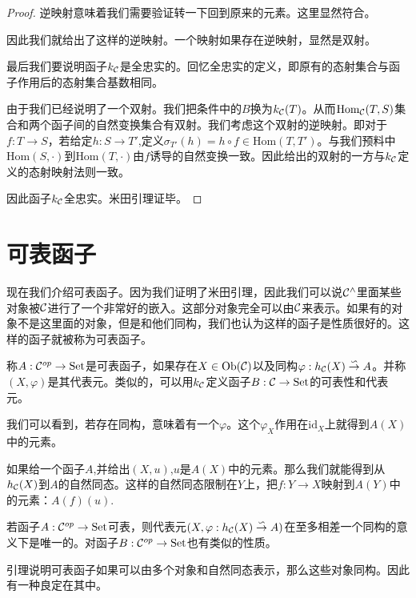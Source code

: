 \begin{proof}
        逆映射意味着我们需要验证转一下回到原来的元素。这里显然符合。

        因此我们就给出了这样的逆映射。一个映射如果存在逆映射，显然是双射。

        最后我们要说明函子$k_{\mathcal{C}}$是全忠实的。回忆全忠实的定义，即原有的态射集合与函子作用后的态射集合基数相同。

        由于我们已经说明了一个双射。我们把条件中的$B$换为$k_{\mathcal{C}}(T)$。从而$\text{Hom}_{\mathcal{C}}(T,S)$集合和两个函子间的自然变换集合有双射。我们考虑这个双射的逆映射。即对于$f:T \to S$，若给定$h:S \to T'$,定义$\sigma_{T'}(h)=h \circ f \in \text{Hom}(T,T')$。与我们预料中$\text{Hom}(S,\cdot)$到$\text{Hom}(T,\cdot)$由$f$诱导的自然变换一致。因此给出的双射的一方与$k_{\mathcal{C}}$定义的态射映射法则一致。

        因此函子$k_{\mathcal{C}}$全忠实。米田引理证毕。
    \end{proof}
    
    \section{可表函子}
    现在我们介绍可表函子。因为我们证明了米田引理，因此我们可以说${\mathcal{C}}^{\wedge}$里面某些对象被$\mathcal{C}$进行了一个非常好的嵌入。这部分对象完全可以由$\mathcal{C}$来表示。如果有的对象不是这里面的对象，但是和他们同构，我们也认为这样的函子是性质很好的。这样的函子就被称为可表函子。
    \begin{definition}{}
        称$A: \mathcal{C}^{op} \to \mathrm{Set}$是可表函子，如果存在$X \in \mathrm{Ob}(\mathcal{C})$以及同构$\varphi:h_{\mathcal{C}}(X) \overset{\backsim}{\to} A$。并称$(X,\varphi)$是其代表元。类似的，可以用$k_{\mathcal{C}}$定义函子$B:\mathcal{C} \to \mathrm{Set}$的可表性和代表元。
    \end{definition}

    我们可以看到，若存在同构，意味着有一个$\varphi$。这个$\varphi_X$作用在$\mathrm{id}_X$上就得到$A(X)$中的元素。

    如果给一个函子$A$,并给出$(X,u)$,$u$是$A(X)$中的元素。那么我们就能得到从$h_{\mathcal{C}}(X)$到$A$的自然同态。这样的自然同态限制在$Y$上，把$f: Y \to X$映射到$A(Y)$中的元素：$A(f)(u)$.

    \begin{lemma}{}
        若函子$A: \mathcal{C}^{op}\to \mathrm{Set}$可表，则代表元$(X,\varphi:h_{\mathcal{C}}(X) \overset{\backsim}{\to} A)$在至多相差一个同构的意义下是唯一的。对函子$B: \mathcal{C}^{op} \to \mathrm{Set}$也有类似的性质。
    \end{lemma}

    引理说明可表函子如果可以由多个对象和自然同态表示，那么这些对象同构。因此有一种良定在其中。


